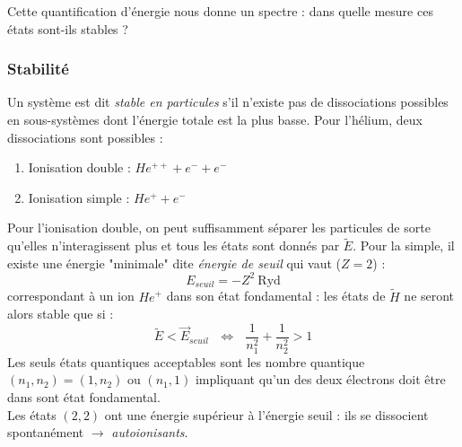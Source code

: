 \documentclass	[11pt, a4paper, openany]{book}
\newcommand{\E}{\vec E}
\begin{document}
	Cette quantification d'énergie nous donne un spectre : dans quelle mesure ces 
	états sont-ils stables ?
	
        \subsubsection{Stabilité}
	    Un système est dit \textit{stable en particules} s'il n'existe pas de dissociations 
	    possibles en sous-systèmes dont l'énergie totale est la plus basse. Pour l'hélium, 
	    deux dissociations sont possibles : 
	    \begin{enumerate}
	    \item Ionisation double : $He^{++} + e^- + e^-$
	    \item Ionisation simple : $He^{+} + e^-$
	    \end{enumerate}

        Pour l'ionisation double, on peut suffisamment séparer les particules de sorte 
        qu'elles n'interagissent plus et tous les états sont donnés par $\tilde{E}$. Pour 
        la simple, il existe une énergie "minimale" dite \textit{énergie de seuil} qui 
        vaut ($Z=2$) :
        \begin{equation}
        E_{seuil} = -Z^2\ \text{Ryd}
        \end{equation}
	    correspondant à un ion $He^+$ dans son état fondamental : les états de $\tilde{H}$
	    ne seront alors stable que si : 
	    \begin{equation}
	    \tilde{E}<\E_{seuil}\ \ \ \Leftrightarrow\ \ \ \frac{1}{n_1^2}+\frac{1}{n_2^2} >1
	    \end{equation}
	    Les seuls états quantiques acceptables sont les nombre quantique $(n_1,n_2) = (1,
	    n_2)$ ou $(n_1,1)$ impliquant qu'un des deux électrons doit être dans sont état
	    fondamental.\\
	    Les états $(2,2)$ ont une énergie supérieur à l'énergie seuil : ils se dissocient
	    spontanément $\rightarrow$ \textit{autoionisants}.
\end{document}
